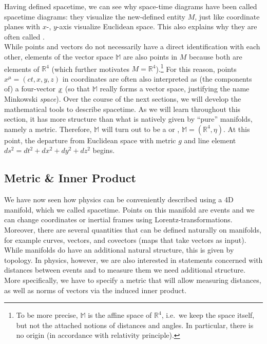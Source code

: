 \documentclass[../relativity_main.tex]{subfiles}
\begin{document}
Having defined spacetime, we can see why space-time diagrams have been called spacetime diagrams: they visualize the new-defined entity $M$, just like coordinate planes with $x$-, $y$-axis visualize Euclidean space. This also explains why they are often called .\\


While points and vectors do not necessarily have a direct identification with each other, elements of the vector space $\mathbb{M}$ are also points in $M$ because both are elements of $\mathbb{R}^4$ (which further motivates $M = \mathbb{R}^4$).\footnote{To be more precise, $\mathbb{M}$ is the affine space of $\mathbb{R}^4$, i.e.~we keep the space itself, but not the attached notions of distances and angles. In particular, there is no origin (in accordance with relativity principle).} For this reason, points $x^\mu = (ct, x, y, z)$ in coordinates are often also interpreted as (the components of) a four-vector $\underline{x}$ (so that $\mathbb{M}$ really forms a vector space, justifying the name Minkowski \emph{space}). Over the course of the next sections, we will develop the mathematical tools to describe spacetime. As we will learn throughout this section, it has more structure than what is natively given by \enquote{pure} manifolds, namely a metric. Therefore, $\mathbb{M}$ will turn out to be a  or , $\mathbb{M} = (\mathbb{R}^4, \eta)$. At this point, the departure from Euclidean space with metric $g$ and line element $ds^2 = dt^2 + dx^2 + dy^2 + dz^2$ begins.






		\subsection{Metric \& Inner Product}
We have now seen how physics can be conveniently described using a 4D manifold, which we called spacetime. Points on this manifold are events and we can change coordinates or inertial frames using Lorentz-transformations. Moreover, there are several quantities that can be defined naturally on manifolds, for example curves, vectors, and covectors (maps that take vectors as input). While manifolds do have an additional natural structure, this is given by topology. In physics, however, we are also interested in statements concerned with distances between events and to measure them we need additional structure. More specifically, we have to specify a metric that will allow measuring distances, as well as norms of vectors via the induced inner product.
\end{document}
